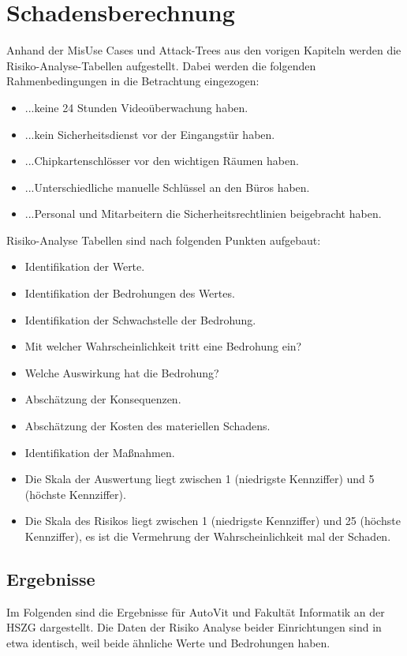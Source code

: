 \section{Schadensberechnung}
Anhand der MisUse Cases und Attack-Trees aus den vorigen Kapiteln werden die Risiko-Analyse-Tabellen  aufgestellt. Dabei werden die folgenden Rahmenbedingungen in die Betrachtung eingezogen:
\begin{itemize}
\item ...keine 24 Stunden Videoüberwachung haben.
\item ...kein Sicherheitsdienst vor der Eingangstür haben.
\item ...Chipkartenschlösser vor den wichtigen Räumen haben.
\item ...Unterschiedliche manuelle Schlüssel an den Büros haben.
\item ...Personal und Mitarbeitern die Sicherheitsrechtlinien beigebracht haben.
\end{itemize}

\noindent
Risiko-Analyse Tabellen sind nach folgenden Punkten aufgebaut:
\begin{itemize}
\item Identifikation der Werte.
\item Identifikation der Bedrohungen des Wertes.
\item Identifikation der Schwachstelle der Bedrohung.
\item Mit welcher Wahrscheinlichkeit tritt eine Bedrohung ein? 
\item Welche Auswirkung hat die Bedrohung?
\item Abschätzung der Konsequenzen.
\item Abschätzung  der Kosten des materiellen Schadens.
\item Identifikation der Maßnahmen.
\item Die Skala der Auswertung liegt zwischen 1 (niedrigste Kennziffer) und 5 (höchste Kennziffer). 
\item Die Skala des Risikos liegt zwischen 1 (niedrigste Kennziffer) und 25 (höchste Kennziffer), es ist die Vermehrung der Wahrscheinlichkeit mal der Schaden.
\end{itemize}

\subsection{Ergebnisse}
Im Folgenden sind die Ergebnisse für AutoVit und Fakultät Informatik an der HSZG dargestellt. Die Daten der Risiko Analyse beider Einrichtungen sind in etwa identisch, weil beide ähnliche Werte und Bedrohungen haben.

